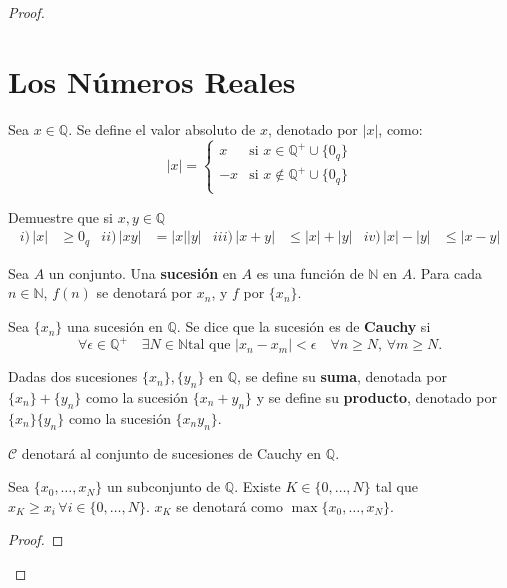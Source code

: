 \begin{proof}
\section{Los Números Reales}
\begin{definition}
  Sea $x \in \mathbb{Q}$. Se define el valor absoluto de $x$, denotado por
  $|x|$, como:
  \[
    |x| =\begin{cases}
      x  &\mbox{si } x \in \mathbb{Q}^+\cup \{0_q\} \\
      -x &\mbox{si } x \notin \mathbb{Q}^+\cup \{0_q\} \\
    \end{cases}
  \]
\end{definition}
\begin{problem} Demuestre que si $x,y \in \mathbb{Q}$
  \begin{align*}
    i) \,|x| &\geq 0_q & ii)\, |xy|&= |x||y| & iii) \, |x+y| &\leq |x| + |y|
             & iv)\, |x|-|y| &\leq |x-y|
  \end{align*}
\end{problem}
\begin{definition}
  Sea $A$ un conjunto. Una \textbf{sucesión} en $A$ es una función de $\mathbb{N}$ en
  $A$. Para cada $n \in \mathbb{N}$, $f(n)$ se denotará por $x_n$, y $f$ por
  $\{x_n\}$.
\end{definition}
\begin{definition}
  Sea $\{x_n\}$ una sucesión en $\mathbb{Q}$. Se dice que la sucesión es de
  \textbf{Cauchy} si 
  \[
    \forall \epsilon \in \mathbb{Q}^+ \quad \exists N \in \mathbb{N} \mbox{
    tal que } |x_n - x_m|< \epsilon \quad \forall n \geq N, \, \forall m \geq
    N.
  \]
\end{definition}
\begin{definition}
  Dadas dos sucesiones $\{x_n\}, \{y_n\}$ en $\mathbb{Q}$, se define su
  \textbf{suma}, denotada por $\{x_n\} + \{y_n \}$ como la sucesión $\{x_n +
  y_n\}$ y se define su
  \textbf{producto}, denotado por $\{x_n\} \{y_n \}$ como la sucesión $\{x_n
  y_n\}$.
\end{definition}
$\mathcal{C}$ denotará al conjunto de sucesiones de Cauchy en $\mathbb{Q}$.
\begin{proposition}\label{prop:41}
  Sea $\{x_0, \ldots, x_N\}$ un subconjunto de $\mathbb{Q}$. Existe $K \in
  \{0, \ldots, N\}$ tal que $x_K \geq x_i \, \forall i \in \{0, \ldots, N\}$.
  $x_K$ se denotará como $\max \{x_0, \ldots, x_N\}$.
\end{proposition}
\begin{proof}

\end{proof}
\end{proof}
